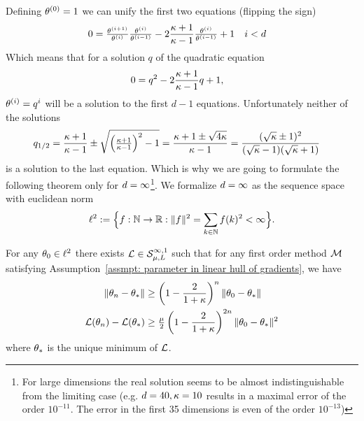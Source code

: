 Defining \(\weights^{(0)} =1\) we can unify the first two equations (flipping
the sign)
\begin{align*}
	0&= 
	\tfrac{\weights^{(i+1)}}{\weights^{(i)}}\tfrac{\weights^{(i)}}{\weights^{(i-1)}}
	- 2\frac{\condition+1}{\condition -1}\tfrac{\weights^{(i)}}{\weights^{(i-1)}}
	+ 1  && i <d
\end{align*}
%
Which means that for a solution \(q\) of the quadratic equation
\begin{align}\label{eq: coloring solution quadratic equation}
	0&= q^2 - 2\frac{\condition+1}{\condition -1}q + 1,
\end{align}
%
\(\weights^{(i)} = q^i\) will be a solution to the first \(d-1\) equations.
Unfortunately neither of the solutions
%
\begin{align*}
	q_{1/2} &= \frac{\condition+1}{\condition -1} \pm 
	\sqrt{\left(\tfrac{\condition+1}{\condition-1}\right)^2 -1}
	=\frac{\condition +1 \pm \sqrt{4\condition}}{\condition -1}
	= \frac{(\sqrt{\condition}\pm 1)^2}{(\sqrt{\condition}-1)(\sqrt{\condition}+1)}
\end{align*}
%
is a solution to the last equation. Which is why we are going to formulate the
following theorem only for \(\dimension=\infty\)\footnote{
	For large dimensions the real solution seems to be almost
	indistinguishable from the limiting case (e.g. \(\dimension=40,
	\condition=10\) results in a maximal error of the order \(10^{-11}\). The
	error in the first 35 dimensions is even of the order \(10^{-13}\))
}.
We formalize \(\dimension=\infty\) as the sequence space with euclidean norm
\begin{align*}
	\sequenceSpace := \Big\{
		f:\naturals \to \reals : \| f\|^2 = \sum_{k\in\naturals} f(k)^2< \infty
	\Big\}.
\end{align*}
%
\begin{theorem}
	\label{thm: strong convexity complexity bound}
	For any \(\weights_0\in\sequenceSpace\) there exists
	\(\Loss\in\strongConvex[\infty,1]{\lbound}{\ubound}\) such that for any
	first order method \(\firstOrderMethod\) satisfying Assumption~\ref{assmpt:
	parameter in linear hull of gradients}, we have
	\begin{subequations}
	\begin{align}
		\|\weights_n - \minimum\|
		&\ge \left(1-\frac2{1+\condition}\right)^n \|\weights_0 - \minimum\| \\
		\Loss(\weights_n) - \Loss(\minimum)
		&\ge \tfrac{\lbound}{2}
		\left(1-\frac2{1+\condition}\right)^{2n} \|\weights_0 - \minimum\|^2
	\end{align}
	\end{subequations}
	where \(\minimum\) is the unique minimum of \(\Loss\).
\end{theorem}
